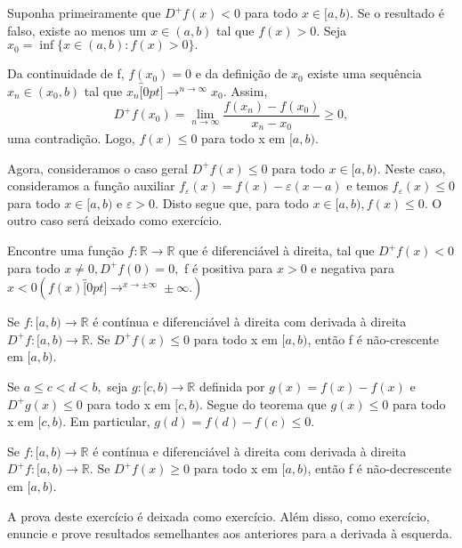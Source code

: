 \documentclass[analysis_notes.tex]{subfiles}
\begin{document}
\begin{proof*}
	Suponha primeiramente que \(D^{+}f(x) < 0\) para todo \(x\in[a, b).\) Se o resultado
	é falso, existe ao menos um \(x\in(a, b)\) tal que \(f(x) > 0.\) Seja
	\(x_{0}=\inf\{x\in(a, b): f(x) > 0\}.\)

	Da continuidade de f, \(f(x_{0}) = 0\) e da defini\c cão de \(x_{0}\) existe
	uma sequência \(x_{n}\in(x_{0}, b)\) tal que \(x_{n}\overbracket[0pt]{\longrightarrow}^{n\to \infty}x_{0}.\)
	Assim,
	\[
		D^{+}f(x_{0}) = \lim_{n\to \infty}\frac{f(x_{n})-f(x_{0})}{x_{n}-x_{0}}\geq 0,
	\]
	uma contradi\c cão. Logo, \(f(x)\leq 0\) para todo x em \([a, b)\).

	Agora, consideramos o caso geral \(D^{+}f(x)\leq 0\) para todo \(x\in[a, b).\)
	Neste caso, consideramos a fun\c cão auxiliar \(f_{\varepsilon }(x) = f(x) - \varepsilon (x-a)\)
	e temos \(f_{\varepsilon }(x)\leq 0\) para todo \(x\in[a, b)\) e \(\varepsilon >0.\)
	Disto segue que, para todo \(x\in[a, b), f(x)\leq 0\). O outro caso será deixado como
	exercício. \qedsymbol
\end{proof*}
\begin{example}
	Encontre uma fun\c cão \(f:\mathbb{R}\rightarrow \mathbb{R}\) que é diferenciável
	à direita, tal que \(D^{+}f(x) < 0\) para todo \(x\neq0, D^{+}f(0)=0,\) f é positiva
	para \(x > 0\) e negativa para \(x < 0 (f(x)\overbracket[0pt]{\longrightarrow}^{x\to \pm\infty}\pm\infty.)\)
\end{example}
\begin{crl*}
	Se \(f:[a, b)\rightarrow \mathbb{R}\) é contínua e diferenciável à direita com derivada
	à direita \(D^{+}f:[a, b)\rightarrow \mathbb{R}.\) Se \(D^{+}f(x)\leq 0\) para todo x em \([a, b)\),
	então f é não-crescente em \([a, b).\)
\end{crl*}
\begin{proof*}
	Se \(a\leq c < d < b,\) seja \(g:[c, b)\rightarrow \mathbb{R}\) definida por
	\(g(x) = f(x) - f(x)\) e \(D^{+}g(x)\leq 0\) para todo x em \([c, b)\). Segue do
	teorema que \(g(x)\leq 0\) para todo x em \([c, b).\) Em particular, \(g(d) = f(d) - f(c)\leq 0\). \qedsymbol
\end{proof*}
\begin{crl*}
	Se \(f:[a, b)\rightarrow \mathbb{R}\) é contínua e diferenciável à direita com
	derivada à direita \(D^{+}f:[a, b)\rightarrow \mathbb{R}.\) Se \(D^{+}f(x)\geq 0\)
	para todo x em \([a, b)\), então f é não-decrescente em \([a, b).\)
\end{crl*}
A prova deste exercício é deixada como exercício. Além disso, como exercício,
enuncie e prove resultados semelhantes aos anteriores para a derivada à esquerda.
\end{document}
